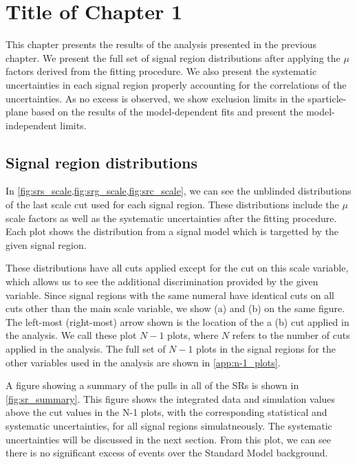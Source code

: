 

\chapter[Results][Top of Page Title]{Title of Chapter 1}

This chapter presents the results of the analysis presented in the previous chapter.
We present the full set of signal region distributions after applying the $\mu$ factors derived from the fitting procedure.
We also present the systematic uncertainties in each signal region properly accounting for the correlations of the uncertainties.
As no excess is observed, we show exclusion limits in the sparticle-\lsp plane based on the results of the model-dependent fits and present the model-independent limits.

\section{Signal region distributions}

In \ref{fig:srs_scale,fig:srg_scale,fig:src_scale}, we can see the unblinded distributions of the last scale cut used for each signal region.
These distributions include the $\mu$ scale factors as well as the systematic uncertainties after the fitting procedure.
Each plot shows the distribution from a signal model which is targetted by the given signal region.

These distributions have all cuts applied except for the cut on this scale variable, which allows us to see the additional discrimination provided by the given variable.
Since signal regions with the same numeral have identical cuts on all cuts other than the main scale variable, we show (a) and (b) on the same figure.
The left-most (right-most) arrow shown is the location of the a (b) cut applied in the analysis.
We call these plot \textit{$N-1$} plots, where $N$ refers to the number of cuts applied in the analysis.
The full set of $N-1$ plots in the signal regions for the other variables used in the analysis are shown in \ref{app:n-1_plots}.

A figure showing a summary of the pulls in all of the SRs is shown in \ref{fig:sr_summary}.
This figure shows the integrated data and simulation values above the cut values in the N-1 plots, with the corresponding statistical and systematic uncertainties, for all signal regions simulatneously.
The systematic uncertainties will be discussed in the next section.
From this plot, we can see there is no significant excess of events over the Standard Model background.

